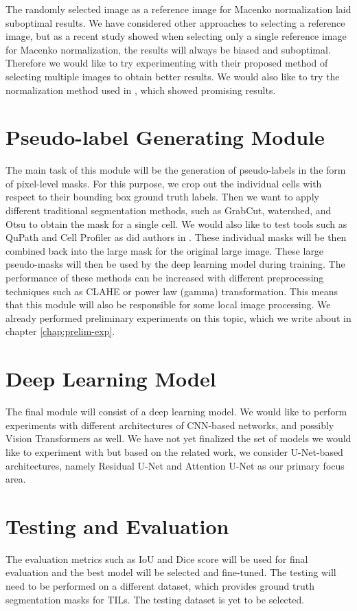 The randomly selected image as a reference image for Macenko normalization laid suboptimal results. We have considered other approaches to selecting a reference image, but as a recent study \cite{Ivanov2024} showed when selecting only a single reference image for Macenko normalization, the results will always be biased and suboptimal. Therefore we would like to try experimenting with their proposed method of selecting multiple images to obtain better results. We would also like to try the normalization method used in \cite{Vahadane2015}, which showed promising results.

\section{Pseudo-label Generating Module}
The main task of this module will be the generation of pseudo-labels in the form of pixel-level masks. For this purpose, we crop out the individual cells with respect to their bounding box ground truth labels. Then we want to apply different traditional segmentation methods, such as GrabCut, watershed, and Otsu to obtain the mask for a single cell. We would also like to test tools such as QuPath and Cell Profiler as did authors in \cite{Zhang2022}. These individual masks will be then combined back into the large mask for the original large image. These large pseudo-masks will then be used by the deep learning model during training. The performance of these methods can be increased with different preprocessing techniques such as CLAHE or power law (gamma) transformation. This means that this module will also be responsible for some local image processing. We already performed preliminary experiments on this topic, which we write about in chapter \ref{chap:prelim-exp}.

\section{Deep Learning Model}
The final module will consist of a deep learning model. We would like to perform experiments with different architectures of CNN-based networks, and possibly Vision Transformers as well. We have not yet finalized the set of models we would like to experiment with but based on the related work, we consider U-Net-based architectures, namely Residual U-Net and Attention U-Net as our primary focus area. 

\section{Testing and Evaluation}
The evaluation metrics such as IoU and Dice score will be used for final evaluation and the best model will be selected and fine-tuned. The testing will need to be performed on a different dataset, which provides ground truth segmentation masks for TILs. The testing dataset is yet to be selected.
